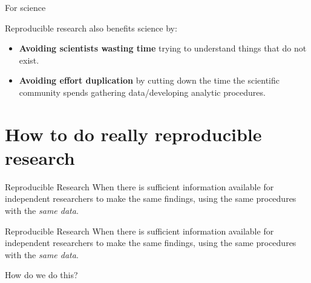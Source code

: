\documentclass[10pt]{beamer}
\begin{document}
\begin{frame}{For science}

    Reproducible research also benefits science by:

    \begin{itemize}
        \item \textbf{Avoiding scientists wasting time} trying to understand things that do not exist.

        \vspace{0.5cm}

        \item \textbf{Avoiding effort duplication} by cutting down the time the scientific community spends gathering data/developing analytic procedures.
    \end{itemize}


\end{frame}

\section{How to do really reproducible research}

\begin{frame}

\begin{exampleblock}{Reproducible Research}
    When there is sufficient information available for independent researchers to make the same findings, using the same procedures with the \emph{same data}.
\end{exampleblock}

\end{frame}

\begin{frame}

\begin{exampleblock}{Reproducible Research}
    When there is sufficient information available for independent researchers to make the same findings, using the same procedures with the \emph{same data}.
\end{exampleblock}

    \vspace{1cm}

    \begin{center}
        {\LARGE{How do we do this?}}
    \end{center}

\end{frame}
\end{document}
